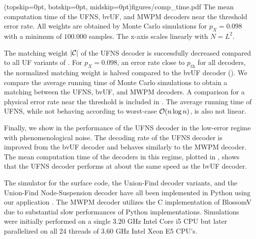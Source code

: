 \Figure[b!](topskip=0pt, botskip=0pt, midskip=0pt){figures/comp_time.pdf}{
  The mean computation time of the UFNS, bvUF, and MWPM decoders near the threshold error rate. All weights are obtained by Monte Carlo simulations for $p_X=0.098$ with a minimum of $100.000$ samples. The x-axis scales linearly with $N = L^2$.\label{comp_time}}

The matching weight $\lvert\mathcal{C}\rvert$ of the UFNS decoder is successfully decreased compared to all UF variants of . For $p_X = 0.098$, an error rate close to $p_{\text{th}}$ for all decoders, the normalized matching weight is halved compared to the bvUF decoder (). We compare the average running time of Monte Carlo simulations to obtain a matching between the UFNS, bvUF, and MWPM decoders. A comparison for a physical error rate near the threshold is included in . The average running time of UFNS, while not behaving according to worst-case $\mathcal{O}(n \log{n})$, is also not linear. 

Finally, we show in  the performance of the UFNS decoder in the low-error regime with phenomenological noise. The decoding rate of the UFNS decoder is improved from the bvUF decoder and behaves similarly to the MWPM decoder. The mean computation time of the decoders in this regime, plotted in , shows that the UFNS decoder performs at about the same speed as the bvUF decoder.\par

The simulator for the surface code, the Union-Find decoder variants, and the Union-Find Node-Suspension decoder have all been implemented in Python using our application \cite{qsurface}. The MWPM decoder utilizes the C implementation of BlossomV \cite{kolmogorov2009blossom} due to substantial slow performances of Python implementations. Simulations were initially performed on a single 3.20 GHz Intel Core i5 CPU but later parallelized on all 24 threads of 3.60 GHz Intel Xeon E5 CPU's. 